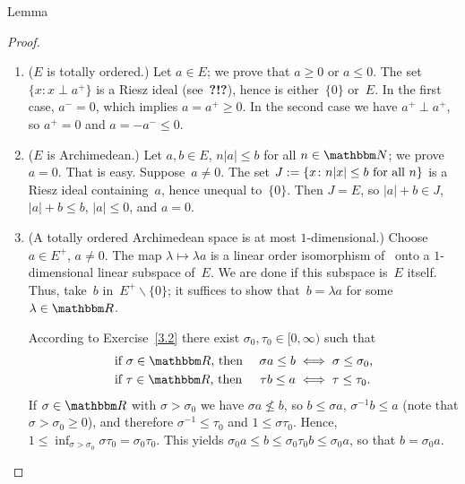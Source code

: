\documentclass[main.tex]{subfiles}
\begin{document}
%
%
\begin{psec}{3.5}{Lemma}
\end{psec}
\begin{proof}
\begin{enumerate}[label=(\Roman*)]
\item \label{3.5-I} 
($E$ is totally ordered.) 
Let $a\in E$; 
we prove that $a\geq 0$ or $a\leq 0$.
The set $\{ x\colon x\perp a^+ \}$
is a Riesz ideal (see~\textbf{?!?}),
hence is either~$\{0\}$ or~$E$.
In the first case,
$a^-=0$, 
which implies $a=a^+\geq 0$.
In the second case
we have $a^+ \perp a^+$, so $a^+=0$ 
and $a=-a^-\leq 0$.
%
\item \label{3.5-II}
($E$ is Archimedean.)
Let $a,b\in E$, $n|a|\leq b$ for all $n\in \N$;
we prove $a=0$. 
That is easy. 
Suppose~$a\neq 0$.
The set $J:=\{ x\colon n|x|\leq b\text{ for all }n\}$
is a Riesz ideal containing~$a$,
hence unequal to~$\{0\}$.
Then $J=E$,
so $|a|+b\in J$,
$|a|+b\leq b$,
$|a|\leq 0$,
and $a=0$.
%
\item \label{3.5-III} 
(A totally ordered Archimedean space is at most $1$-dimensional.)
Choose $a\in E^+$, $a\neq 0$.
The map $\lambda \mapsto \lambda a$ 
is a linear order isomorphism
of~\R{} onto a $1$-dimensional linear subspace of~$E$.
We are done if this subspace is~$E$ itself.
Thus, take~$b$ in~$E^+\backslash\{0\}$;
it suffices to show that~$b=\lambda a$
for some $\lambda \in \R$.

According to Exercise~\ref{3.2} there exist
$\sigma_0,\tau_0\in[0,\infty)$ such that
\begin{alignat*}{2}
&\htam{ if }\sigma\in\R\htam{, then }
  & \sigma a\leq b 
  &\iff \sigma\leq\sigma_0\htam{, } \\
&\htam{ if }\tau\in\R\htam{, then }
  & \tau b \leq a 
  &\iff \tau \leq \tau_0\htam{.}
\end{alignat*}
If $\sigma\in\R$ with $\sigma>\sigma_0$
we have $\sigma a\nleq b$,
so $b\leq \sigma a$,
$\sigma^{-1} b\leq a$
(note that $\sigma > \sigma_0 \geq 0$),
and therefore $\sigma^{-1}\leq \tau_0$
and $1\leq \sigma\tau_0$.
Hence, $1\leq \inf_{\sigma > \sigma_0}\sigma \tau_0 = \sigma_0 \tau_0$.
This yields $\sigma_0 a \leq b \leq \sigma_0 \tau_0 b \leq \sigma_0 a$,
so that $b = \sigma_0 a$. \xqed
\end{enumerate}
\end{proof}
%
%
\end{document}
